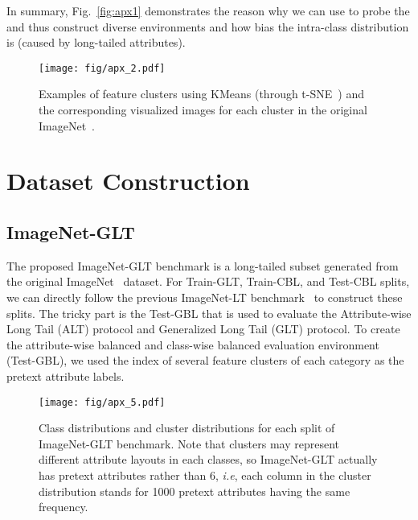 \documentclass{article}
\def\ie{\emph{i.e}} \def\Ie{\emph{I.e}}
\begin{document}
In summary, Fig.~\ref{fig:apx1} demonstrates the reason why we can use  to probe the  and thus construct diverse environments and how bias the intra-class distribution is (caused by long-tailed attributes).


\begin{figure}
   \begin{minipage}[b]{1.0\linewidth}
   \centerline{\texttt{[image: fig/apx\_2.pdf]}}
   \end{minipage}
   \caption{Examples of feature clusters using KMeans (through t-SNE~\cite{hinton2002stochastic}) and the corresponding visualized images for each cluster in the original ImageNet~\cite{russakovsky2015imagenet}.}
   \label{fig:apx2} \end{figure}


\section{Dataset Construction}

\subsection{ImageNet-GLT}

The proposed ImageNet-GLT benchmark is a long-tailed subset generated from the original ImageNet~\cite{russakovsky2015imagenet} dataset. For Train-GLT, Train-CBL, and Test-CBL splits, we can directly follow the previous ImageNet-LT benchmark~\cite{liu2019large} to construct these splits. The tricky part is the Test-GBL that is used to evaluate the Attribute-wise Long Tail (ALT) protocol and Generalized Long Tail (GLT) protocol. To create the attribute-wise balanced and class-wise balanced evaluation environment (Test-GBL), we used the index of several feature clusters of each category as the pretext attribute labels. 


\begin{figure}
   \begin{minipage}[b]{1.0\linewidth}
   \centerline{\texttt{[image: fig/apx\_5.pdf]}}
   \end{minipage}
   \caption{Class distributions and cluster distributions for each split of ImageNet-GLT benchmark. Note that clusters may represent different attribute layouts in each classes, so ImageNet-GLT actually has  pretext attributes rather than 6, \ie, each column in the cluster distribution stands for 1000 pretext attributes having the same frequency.}
   \label{fig:apx5} \end{figure}
\end{document}
